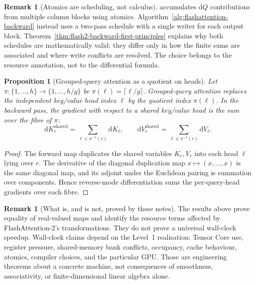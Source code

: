 \documentclass[11pt]{amsart}
\theoremstyle{plain}
\newtheorem{proposition}[theorem]{Proposition}
\theoremstyle{definition}
\newtheorem{remark}[theorem]{Remark}
\begin{document}
\begin{remark}[Atomics are scheduling, not calculus]
\cite{Dao2023} accumulates $\mathrm{d}Q$ contributions from multiple column
blocks using atomics.  Algorithm~\ref{alg:flashattention-backward} instead
uses a two-pass schedule with a single writer for each output block.
Theorem~\ref{thm:flash2-backward-first-principles} explains why both schedules are
mathematically valid: they differ only in how the finite sums are associated
and where write conflicts are resolved.  The choice belongs to the resource
annotation, not to the differential formula.
\end{remark}

\begin{proposition}[Grouped-query attention as a quotient on heads]
\label{prop:gqa-quotient}
Let $\pi:\{1,\ldots,h\}\to\{1,\ldots,h/g\}$ be
$\pi(\ell)=\lceil \ell/g\rceil$.  Grouped-query attention replaces the
independent key/value head index $\ell$ by the quotient index $\pi(\ell)$.
In the backward pass, the gradient with respect to a shared key/value head is
the sum over the fibre of $\pi$:
\[
    \mathrm{d}K_r^{\mathrm{shared}}
      = \sum_{\ell\in\pi^{-1}(r)} \mathrm{d}K_\ell,\qquad
    \mathrm{d}V_r^{\mathrm{shared}}
      = \sum_{\ell\in\pi^{-1}(r)} \mathrm{d}V_\ell.
\]
\end{proposition}
\begin{proof}
The forward map duplicates the shared variables $K_r,V_r$ into each head
$\ell$ lying over $r$.  The derivative of the diagonal duplication map
$x\mapsto(x,\ldots,x)$ is the same diagonal map, and its adjoint under the
Euclidean pairing is summation over components.  Hence reverse-mode
differentiation sums the per-query-head gradients over each fibre.
\end{proof}

\begin{remark}[What is, and is not, proved by these notes]
The results above prove equality of real-valued maps and identify the
resource terms affected by FlashAttention-2's transformations.  They do not
prove a universal wall-clock speedup.  Wall-clock claims depend on the Level~1
realisation: Tensor Core use, register pressure, shared-memory bank conflicts,
occupancy, cache behaviour, atomics, compiler choices, and the particular GPU.
Those are engineering theorems about a concrete machine, not consequences of
smoothness, associativity, or finite-dimensional linear algebra alone.
\end{remark}
\end{document}
